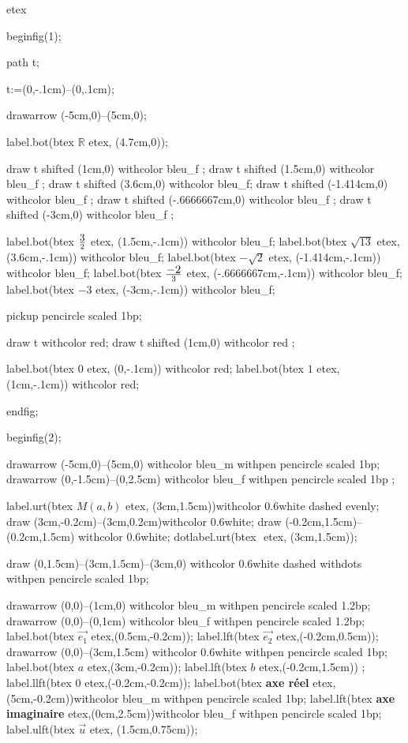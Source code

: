 \documentclass[12pt]{article}
\begin{document}
 
etex 



%
%
%
%
%
%
%
%

beginfig(1);

path t;

t:=(0,-.1cm)--(0,.1cm);

drawarrow  (-5cm,0)--(5cm,0);

label.bot(btex $\mathbb{R}$ etex, (4.7cm,0));

draw t shifted (1cm,0) withcolor bleu_f ;
draw t shifted (1.5cm,0) withcolor bleu_f ;
draw t shifted (3.6cm,0) withcolor bleu_f;
draw t shifted (-1.414cm,0) withcolor bleu_f ;
draw t shifted (-.6666667cm,0) withcolor bleu_f ;
draw t shifted (-3cm,0) withcolor bleu_f ;

label.bot(btex $\displaystyle 3 \over 2$ etex, (1.5cm,-.1cm)) withcolor bleu_f;
label.bot(btex $\sqrt{13}$ etex, (3.6cm,-.1cm)) withcolor bleu_f;
label.bot(btex $-\sqrt{2}$ etex, (-1.414cm,-.1cm)) withcolor bleu_f;
label.bot(btex $\displaystyle -2 \over 3$ etex, (-.6666667cm,-.1cm)) withcolor bleu_f;
label.bot(btex $-3$ etex, (-3cm,-.1cm)) withcolor bleu_f;

pickup pencircle scaled 1bp;

draw t withcolor red;
draw t shifted (1cm,0) withcolor red ;

label.bot(btex $0$ etex, (0,-.1cm)) withcolor red;
label.bot(btex $1$ etex, (1cm,-.1cm)) withcolor red;

endfig;


beginfig(2);

drawarrow (-5cm,0)--(5cm,0) withcolor bleu_m withpen pencircle scaled 1bp;
drawarrow (0,-1.5cm)--(0,2.5cm)  withcolor bleu_f withpen pencircle scaled 1bp ;

label.urt(btex $M(a,b)$ etex, (3cm,1.5cm))withcolor 0.6white dashed evenly;
draw (3cm,-0.2cm)--(3cm,0.2cm)withcolor 0.6white;
draw (-0.2cm,1.5cm)--(0.2cm,1.5cm) withcolor 0.6white;
dotlabel.urt(btex $ $ etex, (3cm,1.5cm));




draw (0,1.5cm)--(3cm,1.5cm)--(3cm,0) withcolor 0.6white dashed withdots withpen pencircle scaled 1bp;

drawarrow (0,0)--(1cm,0) withcolor bleu_m withpen pencircle scaled 1.2bp;
drawarrow (0,0)--(0,1cm) withcolor bleu_f withpen pencircle scaled 1.2bp;
label.bot(btex $\overrightarrow{e_1}$ etex,(0.5cm,-0.2cm));
label.lft(btex $\overrightarrow{e_2}$ etex,(-0.2cm,0.5cm));
drawarrow (0,0)--(3cm,1.5cm) withcolor 0.6white withpen pencircle scaled 1bp;
label.bot(btex $a$ etex,(3cm,-0.2cm));
label.lft(btex $b$ etex,(-0.2cm,1.5cm)) ;
label.llft(btex $0$ etex,(-0.2cm,-0.2cm));
label.bot(btex \textbf{axe r\'eel} etex,(5cm,-0.2cm))withcolor bleu_m withpen pencircle scaled 1bp;
label.lft(btex \textbf{axe imaginaire} etex,(0cm,2.5cm))withcolor bleu_f withpen pencircle scaled 1bp;
label.ulft(btex $\overrightarrow{u}$ etex, (1.5cm,0.75cm));
\end{document}
